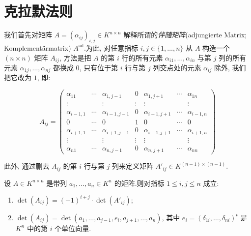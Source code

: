 \section{克拉默法则}\label{sec:4.4}

我们首先对矩阵 $A = (\alpha_{ij})_{i, j} \in K^{n \times n}$ 解释所谓的\emph{伴随矩阵}(\textup{adjungierte Matrix; Komplementärmatrix}) $A^{\mathrm{ad}}$.为此, 对任意指标 $i, j \in \{1, \ldots, n\}$ 从 $A$ 构造一个 $(n \times n)$ 矩阵 $A_{ij}$, 方法是把 $A$ 的第 $i$ 行的所有元素 $\alpha_{i1}, \ldots, \alpha_{in}$ 与第 $j$ 列的所有元素 $\alpha_{1j}, \ldots, \alpha_{nj}$ 都换成 $0$, 只有位于第 $i$ 行与第 $j$ 列交点处的元素 $\alpha_{ij}$ 除外, 我们把它改为 $1$, 即:

\[
A_{ij} = \begin{pmatrix}
\alpha_{11} & \cdots & \alpha_{1, j-1} & 0 & \alpha_{1, j+1} & \cdots & \alpha_{1n} \\
\vdots & & \vdots & \vdots & \vdots & & \vdots \\
\alpha_{i-1, 1} & \cdots & \alpha_{i-1, j-1} & 0 & \alpha_{i-1, j+1} & \cdots & \alpha_{i-1, n} \\
0 & \cdots & 0 & 1 & 0 & \cdots & 0 \\
\alpha_{i+1, 1} & \cdots & \alpha_{i+1, j-1} & 0 & \alpha_{i+1, j+1} & \cdots & \alpha_{i+1, n} \\
\vdots & & \vdots & \vdots & \vdots & & \vdots \\
\alpha_{n1} & \cdots & \alpha_{n, j-1} & 0 & \alpha_{n, j+1} & \cdots & \alpha_{nn}
\end{pmatrix}
\]

此外, 通过删去 $A_{ij}$ 的第 $i$ 行与第 $j$ 列来定义矩阵 $A'_{ij} \in K^{(n-1) \times (n-1)}$.

\begin{remark}\label{rem:4.4.1}
设 $A \in K^{n \times n}$ 是带列 $a_1, \ldots, a_n \in K^n$ 的矩阵.则对指标 $1 \leq i, j \leq n$ 成立:
\begin{enumerate}
\item[(i)] $\det(A_{ij}) = (-1)^{i + j} \cdot \det(A'_{ij})$;
\item[(ii)] $\det(A_{ij}) = \det(a_1, \ldots, a_{j-1}, e_i, a_{j+1}, \ldots, a_n)$, 其中 $e_i = (\delta_{1i}, \ldots, \delta_{ni})^t$ 是 $K^n$ 中的第 $i$ 个单位向量.
\end{enumerate}
\end{remark}

